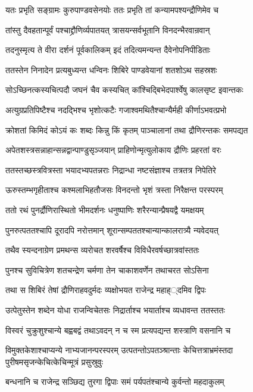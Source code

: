 \twolineshloka
{यतः प्रभृति सङ्ग्रामः कुरुपाण्डवसेनयोः}
{ततः प्रभृति तां कन्यामपश्यन्द्रौणिमेव च}


\twolineshloka
{तांस्तु दैवहतान्पूर्वं पश्चाद्द्रौणिर्व्यपातयत्}
{त्रासयन्सर्वभूतानि विनदन्भैरवान्रवान्}


\twolineshloka
{तदनुस्मृत्य ते वीरा दर्शनं पूर्वकालिकम्}
{इदं तदित्यमन्यन्त दैवेनोपनिपीडिताः}


\twolineshloka
{ततस्तेन निनादेन प्रत्यबुध्यन्त धन्विनः}
{शिबिरे पाण्डवेयानां शतशोऽथ सहस्रशः}


\twolineshloka
{सोऽच्छिनत्कस्यचित्पदौ जघनं चैव कस्यचित्}
{कांश्चिद्बिभेदपार्श्वेषु कालसृष्ट इवान्तकः}


\twolineshloka
{अत्युग्रप्रतिपिष्टैश्च नदद्भिश्च भृशोत्कटैः}
{गजाश्वमथितैश्चान्यैर्मही कीर्णाऽभवत्प्रभो}


\twolineshloka
{क्रोशतां किमिदं कोऽयं कः शब्दः किन्नु किं कृतम्}
{पाञ्चालानां तथा द्रौणिरन्तकः समपद्यत}


\twolineshloka
{अपेतशस्त्रसन्नाहान्सन्नद्वान्पाण्डुसृञ्जयान्}
{प्राहिणोन्मृत्युलोकाय द्रौणिः प्रहरतां वरः}


\twolineshloka
{ततस्तच्छस्त्रवित्रस्ता भयादभ्यपतन्नराः}
{निद्रान्धा नष्टसंज्ञाश्च तत्रतत्र निपेतिरे}


\twolineshloka
{ऊरुस्तम्भगृहीताश्च कश्मलाभिहतौजसः}
{विनदन्तो भृशं त्रस्ता निरैक्षन्त परस्परम्}


\twolineshloka
{ततो रथं पुनर्द्रौणिरास्थितो भीमदर्शनः}
{धनुष्पाणिः शरैरन्यान्प्रैषयद्वै यमक्षयम्}


\twolineshloka
{पुनरुत्पततश्चापि दूरादपि नरोत्तमान्}
{शूरान्सम्पततश्चान्यान्कालरात्र्यै न्यवेदयत्}


\twolineshloka
{तथैव स्यन्दनाग्रेण प्रमथन्स व्यरोचत}
{शरवर्षैश्च विविधैरवर्षच्छात्रवांस्ततः}


\twolineshloka
{पुनश्च सुविचित्रेण शतचन्द्रेण चर्मणा}
{तेन चाकाशवर्णेन तथाचरत सोऽसिना}


\twolineshloka
{तथा स शिबिरं तेषां द्रौणिराहवदुर्मदः}
{व्यक्षोभयत राजेन्द्र महाह््दमिव द्विपः}


\twolineshloka
{उत्पेतुस्तेन शब्देन योधा राजन्विचेतसः}
{निद्रार्ताश्च भयार्ताश्च व्यधावन्त ततस्ततः}


\twolineshloka
{विस्वरं चुक्रुशुश्चान्ये बह्वबद्वं तथाऽवदन्}
{न च स्म प्रत्यपद्यन्त शस्त्राणि वसनानि च}


\threelineshloka
{विमुक्तकेशाश्चाप्यन्ये नाभ्यजानन्परस्परम्}
{उत्पतन्तोऽपतञ्श्रान्ताः केचित्तत्राभ्रमंस्तदा}
{पुरीषमसृजन्केचित्केचिन्मूत्रं प्रसुस्रुवुः}


\twolineshloka
{बन्धनानि च राजेन्द्र सञ्छिद्य तुरगा द्विपाः}
{समं पर्यपतंश्चान्ये कुर्वन्तो महदाकुलम्}


